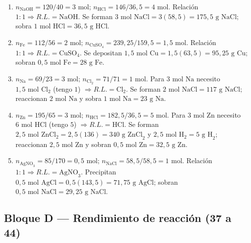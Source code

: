 \documentclass[12pt, letterpaper]{article}
\begin{document}
\begin{enumerate}[leftmargin=*, label=\textbf{\arabic*.}, start=25]
  \item $n_{\text{NaOH}} = 120/40 = 3\text{ mol}$; $n_{\text{HCl}} = 146/36{,}5 = 4\text{ mol}$. Relación $1:1 \Rightarrow R.L. = \text{NaOH}$. Se forman $3\text{ mol NaCl} = 3(58{,}5) = 175{,}5\text{ g NaCl}$; sobra $1\text{ mol HCl} = 36{,}5\text{ g HCl}$.
  \item $n_{\text{Fe}} = 112/56 = 2\text{ mol}$; $n_{\text{CuSO}_4} = 239{,}25/159{,}5 = 1{,}5\text{ mol}$. Relación $1:1 \Rightarrow R.L. = \text{CuSO}_4$. Se depositan $1{,}5\text{ mol Cu} = 1{,}5(63{,}5) = 95{,}25\text{ g Cu}$; sobran $0{,}5\text{ mol Fe} = 28\text{ g Fe}$.
  \item $n_{\text{Na}} = 69/23 = 3\text{ mol}$; $n_{\text{Cl}_2} = 71/71 = 1\text{ mol}$. Para $3\text{ mol Na}$ necesito $1{,}5\text{ mol Cl}_2$ (tengo $1$) $\Rightarrow R.L. = \text{Cl}_2$. Se forman $2\text{ mol NaCl} = 117\text{ g NaCl}$; reaccionan $2\text{ mol Na}$ y sobra $1\text{ mol Na} = 23\text{ g Na}$.
  \item $n_{\text{Zn}} = 195/65 = 3\text{ mol}$; $n_{\text{HCl}} = 182{,}5/36{,}5 = 5\text{ mol}$. Para $3\text{ mol Zn}$ necesito $6\text{ mol HCl}$ (tengo $5$) $\Rightarrow R.L. = \text{HCl}$. Se forman $2{,}5\text{ mol ZnCl}_2 = 2{,}5(136) = 340\text{ g ZnCl}_2$ y $2{,}5\text{ mol H}_2 = 5\text{ g H}_2$; reaccionan $2{,}5\text{ mol Zn}$ y sobran $0{,}5\text{ mol Zn} = 32{,}5\text{ g Zn}$.
  \item $n_{\text{AgNO}_3} = 85/170 = 0{,}5\text{ mol}$; $n_{\text{NaCl}} = 58{,}5/58{,}5 = 1\text{ mol}$. Relación $1:1 \Rightarrow R.L. = \text{AgNO}_3$. Precipitan $0{,}5\text{ mol AgCl} = 0{,}5(143{,}5) = 71{,}75\text{ g AgCl}$; sobran $0{,}5\text{ mol NaCl} = 29{,}25\text{ g NaCl}$.
\end{enumerate}

\subsection*{Bloque D — Rendimiento de reacción (37 a 44)}
\end{document}

